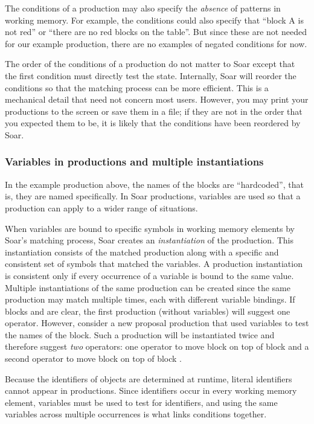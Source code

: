 The conditions of a production may also specify the \emph{absence} of patterns
in working memory. For example, the conditions could also specify that ``block
A is not red'' or ``there are no red blocks on the table''. But since these are
not needed for our example production, there are no examples of negated
conditions for now.

The order of the conditions of a production do not matter to Soar except
that the first condition must directly test the state. Internally, Soar
will reorder the conditions so that the matching process can be more
efficient. This is a mechanical detail that need not concern most
users. However, you may print your productions to the screen or save
them in a file; if they are not in the order that you expected them to
be, it is likely that the conditions have been reordered by Soar.

\subsubsection{Variables in productions and multiple instantiations}

In the example production above, the names of the blocks are ``hardcoded'',
that is, they are named specifically. In Soar productions, variables are used
so that a production can apply to a wider range of situations.

 When variables are bound to specific symbols in working memory elements by Soar’s matching process, Soar creates an \emph{instantiation} of the production. This instantiation consists of the matched production along with a specific and consistent set of symbols that matched the variables. A production instantiation is consistent only if every occurrence of a variable is bound to the same value. Multiple instantiations of the same production can be created since the same production may match multiple times, each with different variable bindings. If blocks  and  are clear, the first production (without variables) will suggest one operator. However, consider a new proposal production that used variables to test the names of the block.  Such a production will be instantiated twice and therefore suggest \textit{two} operators: one operator to move block  on top of block  and a second operator to move block  on top of block .

Because the identifiers of objects are determined at runtime, literal
identifiers cannot appear in productions. Since identifiers occur in
every working memory element, variables must be used to test for
identifiers, and using the same variables across multiple occurrences is what links conditions together.

